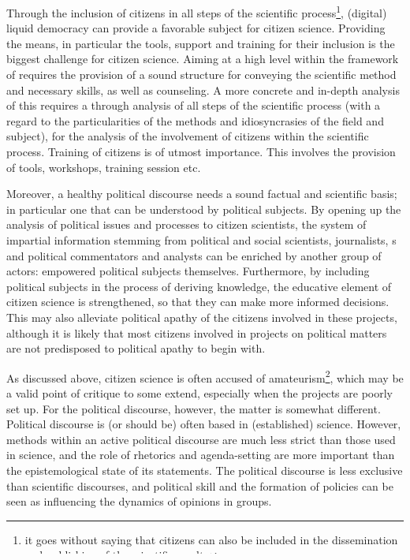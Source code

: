 Through the inclusion of citizens in all steps of the scientific process\footnote{it goes without saying that citizens can also be included in the dissemination and publishing of the scientific results}, (digital) liquid democracy can provide a favorable subject for citizen science. Providing the means, in particular the tools, support and training for their inclusion is the biggest challenge for citizen science. Aiming at a high level within the framework of \textcite{Hakalay2014} requires the provision of a sound structure for conveying the scientific method and necessary skills, as well as counseling. A more concrete and in-depth analysis of this requires a through analysis of all steps of the scientific process (with a regard to the particularities of the methods and idiosyncrasies of the field and subject), for the analysis of the involvement of citizens within the scientific process. Training of citizens is of utmost importance. This involves the provision of tools, workshops, training session etc. 

Moreover, a healthy political discourse needs a sound factual and scientific basis; in particular one that can be understood by political subjects. By opening up the analysis of political issues and processes to citizen scientists, the system of impartial information stemming from political and social scientists, journalists, s and political commentators and analysts can be enriched by another group of actors: empowered political subjects themselves. Furthermore, by including political subjects in the process of deriving knowledge, the educative element of citizen science is strengthened, so that they can make more informed decisions. This may also alleviate political apathy of the citizens involved in these projects, although it is likely that most citizens involved in  projects on political matters are not predisposed to political apathy to begin with.

As discussed above, citizen science is often accused of amateurism\footnote{Which is to a large extend the whole point of citizen science.}, which may be a valid point of critique to some extend, especially when the projects are poorly set up. For the political discourse, however, the matter is somewhat different. Political discourse is (or should be) often based in (established) science. However, methods within an active political discourse are much less strict than those used in science, and the role of rhetorics and agenda-setting are more important than the epistemological state of its statements. The political discourse is less exclusive than scientific discourses, and political skill and the formation of policies can be seen as influencing the dynamics of opinions in groups.

